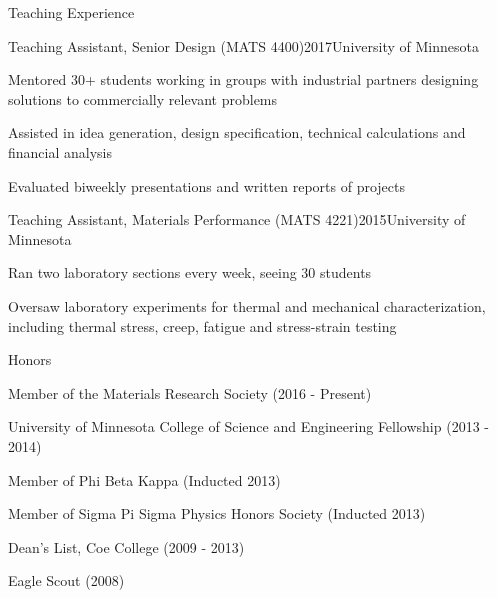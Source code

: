 \documentclass{resume} %
\begin{document}

\begin{rSection}{Teaching Experience}
\begin{rSubsection}{Teaching Assistant, Senior Design (MATS 4400)}{2017}{University of Minnesota}{}
\item Mentored 30+ students working in groups with industrial partners designing solutions to commercially relevant problems
\item Assisted in idea generation, design specification, technical calculations and financial analysis
\item Evaluated biweekly presentations and written reports of projects
\end{rSubsection}
\pagebreak

\begin{rSubsection}{Teaching Assistant, Materials Performance (MATS 4221)}{2015}{University of Minnesota}{}
\item Ran two laboratory sections every week, seeing 30 students
\item Oversaw laboratory experiments for thermal and mechanical characterization, including thermal stress, creep, fatigue and stress-strain testing
\end{rSubsection}

\end{rSection}

\begin{rSection}{Honors}

\item Member of the Materials Research Society (2016 - Present)
\item University of Minnesota College of Science and Engineering Fellowship (2013 - 2014)
\item Member of Phi Beta Kappa (Inducted 2013)
\item Member of Sigma Pi Sigma Physics Honors Society (Inducted 2013)
\item Dean's List, Coe College (2009 - 2013)
\item Eagle Scout (2008)

\end{rSection}
\end{document}
